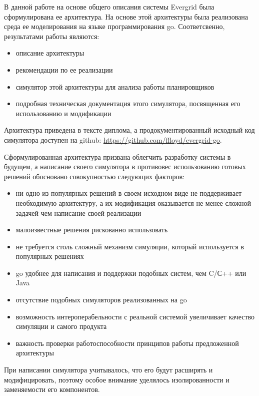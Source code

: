 \conclusion

В данной работе на основе общего описания системы Evergrid была сформулирована ее архитектура. На основе этой архитектуры была реализована среда ее моделирования на языке программирования go. Соответсвенно, результатами работы являются:

\begin{itemize}
	\item описание архитектуры
	\item рекомендации по ее реализации
	\item симулятор этой архитектуры для анализа работы планировщиков
	\item подробная техническая документация этого симулятора, посвященная его использованию и модификации
\end{itemize}

Архитектура приведена в тексте диплома, а продокументированный исходный код симулятора доступен на github: \url{https://github.com/ffloyd/evergrid-go}.

Сформулированная архитектура призвана облегчить разработку системы в будущем, а написание своего симулятора в противовес использованию готовых решений обосновано совокупностью следующих факторов:

\begin{itemize}
	\item ни одно из популярных решений в своем исходном виде не поддерживает необходимую архитектуру, а их модификация оказывается не менее сложной задачей чем написание своей реализации
	\item малоизвестные решения рискованно использовать
	\item не требуется столь сложный механизм симуляции, который используется в популярных решениях
	\item go удобнее для написания и поддержки подобных систем, чем C/С++ или Java
	\item отсутствие подобных симуляторов реализованных на go
	\item возможность интероперабельности с реальной системой увеличивает качество симуляции и самого продукта
	\item важность проверки работоспособности принципов работы предложенной архитектуры
\end{itemize}

При написании симулятора учитывалось, что его будут расширять и модифицировать, поэтому особое внимание уделялось изолированности и заменяемости его компонентов.
